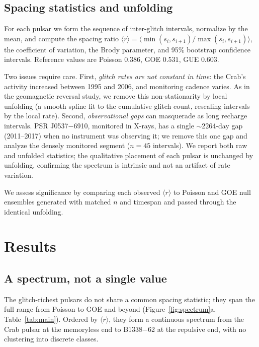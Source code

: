 \documentclass[12pt,a4paper]{article}
\begin{document}
\subsection{Spacing statistics and unfolding}

For each pulsar we form the sequence of inter-glitch intervals, normalize by the mean, and compute the spacing ratio $\langle r\rangle=\langle \min(s_i,s_{i+1})/\max(s_i,s_{i+1})\rangle$, the coefficient of variation, the Brody parameter, and 95\% bootstrap confidence intervals. Reference values are Poisson $0.386$, GOE $0.531$, GUE $0.603$.

Two issues require care. First, \emph{glitch rates are not constant in time}: the Crab's activity increased between 1995 and 2006, and monitoring cadence varies. As in the geomagnetic reversal study, we remove this non-stationarity by local unfolding (a smooth spline fit to the cumulative glitch count, rescaling intervals by the local rate). Second, \emph{observational gaps} can masquerade as long recharge intervals. PSR J0537$-$6910, monitored in X-rays, has a single $\sim$2264-day gap (2011--2017) when no instrument was observing it; we remove this one gap and analyze the densely monitored segment ($n=45$ intervals). We report both raw and unfolded statistics; the qualitative placement of each pulsar is unchanged by unfolding, confirming the spectrum is intrinsic and not an artifact of rate variation.

We assess significance by comparing each observed $\langle r\rangle$ to Poisson and GOE null ensembles generated with matched $n$ and timespan and passed through the identical unfolding.

\section{Results}

\subsection{A spectrum, not a single value}

The glitch-richest pulsars do not share a common spacing statistic; they span the full range from Poisson to GOE and beyond (Figure~\ref{fig:spectrum}a, Table~\ref{tab:main}). Ordered by $\langle r\rangle$, they form a continuous spectrum from the Crab pulsar at the memoryless end to B1338$-$62 at the repulsive end, with no clustering into discrete classes.
\end{document}
